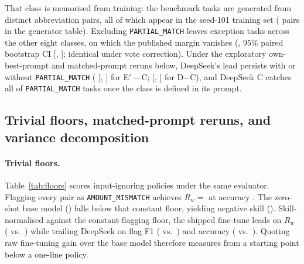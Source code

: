 \documentclass[11pt]{article}
\begin{document}
That class is memorised from training: the \partialN{} benchmark tasks are generated from \pmPairs{} distinct abbreviation pairs, all \pmShared{} of which appear in the seed-101 training set (\pmTableSize{} pairs in the generator table). Excluding \texttt{PARTIAL\_MATCH} leaves \noPmExcN{} exception tasks across the other eight classes, on which the published margin vanishes (\noPmPub{}, 95\% paired bootstrap CI [\noPmPubLo{}, \noPmPubHi{}]; identical under vote correction). Under the exploratory own-best-prompt and matched-prompt reruns below, DeepSeek's lead persists with or without \texttt{PARTIAL\_MATCH} (\noPmBest{} [\noPmBestLo{}, \noPmBestHi{}] for E$'-$C; \noPmMat{} [\noPmMatLo{}, \noPmMatHi{}] for D$-$C), and DeepSeek C catches all \partialC{} of \partialN{} \texttt{PARTIAL\_MATCH} tasks once the class is defined in its prompt.

\subsection{Trivial floors, matched-prompt reruns, and variance decomposition}
\label{sec:others}
\label{sec:variance}

\begin{table}[t]
\centering\small

\caption{Trivial floors, models, and oracle ceiling on the seed-777 pool (\nBench{} tasks). The oracle is the deterministic verifier that generated the labels and scores $1.0$ by construction.}
\label{tab:floors}
\end{table}

\paragraph{Trivial floors.} Table~\ref{tab:floors} scores input-ignoring policies under the same evaluator. Flagging every pair as \texttt{AMOUNT\_MISMATCH} achieves $R_w = $ \floorRw{} at accuracy \floorAcc{}. The zero-shot base model (\rwBase{}) falls below that constant floor, yielding negative skill (\skillBase{}). Skill-normalised against the constant-flagging floor, the shipped fine-tune leads on $R_w$ (\skillChamp{} vs.\ \skillDS{}) while trailing DeepSeek on flag F1 (\skillFOneChamp{} vs.\ \skillFOneDS{}) and accuracy (\skillAccChamp{} vs.\ \skillAccDS{}). Quoting raw fine-tuning gain over the base model therefore measures from a starting point below a one-line policy.

\begin{table}[t]
\centering\small

\caption{Exploratory prompt and decode-budget conditions on the seed-777 pool (\nBench{} tasks). Defining every class lifts DeepSeek on every metric while causing the fine-tune to over-flag. Conditions C, D, and E$'$ use decision-level majority voting; A is one greedy sample.}
\label{tab:matched}
\end{table}
\end{document}
